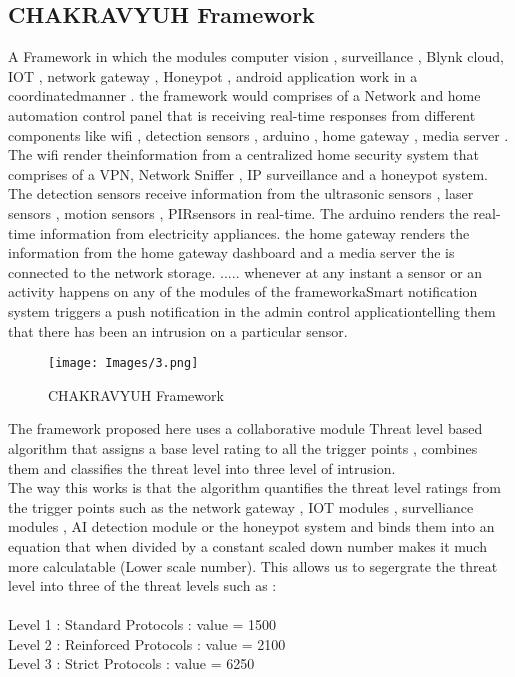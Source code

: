 \documentclass[letterpaper, 10 pt, conference]{ieeeconf}  %
\begin{document}
\subsection{CHAKRAVYUH Framework}
A Framework in which the modules computer vision , surveillance , Blynk cloud, IOT , network gateway , Honeypot , android application work in a coordinatedmanner . the framework would comprises of a Network and home automation control
panel that is receiving real-time responses from different components like wifi , detection sensors , arduino , home gateway , media server . The wifi render theinformation from a centralized home security system that comprises of a VPN, Network Sniffer , IP surveillance and a honeypot system. The detection sensors
receive information from the ultrasonic sensors , laser sensors , motion sensors , PIRsensors in real-time. The arduino renders the real-time information from electricity appliances. the home gateway renders the information from the home gateway dashboard and a media server the is connected to the network storage. ..... whenever at
any instant a sensor or an activity happens on any of the modules of the frameworkaSmart notification system triggers a push notification in the admin control applicationtelling them that there has been an intrusion on a particular sensor. 

\begin{figure}[thpb]
      \centering
      {\parbox{2.8in}{\texttt{[image: Images/3.png]}}}
      \caption{CHAKRAVYUH Framework}
      \label{fig:2}
\end{figure}

The framework proposed here uses a collaborative module Threat level based algorithm that assigns a base level rating to all the trigger points , combines them and classifies the threat level into three level of intrusion. \\
The way this works is that the algorithm quantifies the threat level ratings from the trigger points such as the network gateway , IOT modules , survelliance modules , AI detection module or the honeypot system and binds them into an equation that when divided by a constant scaled down number makes it much more calculatable (Lower scale number). This allows us to segergrate the threat level into three of the threat levels such as : \\ \\
Level 1 : Standard Protocols : value = 1500 \\
Level 2 : Reinforced Protocols : value = 2100 \\
Level 3 : Strict Protocols : value = 6250 \\
\end{document}
